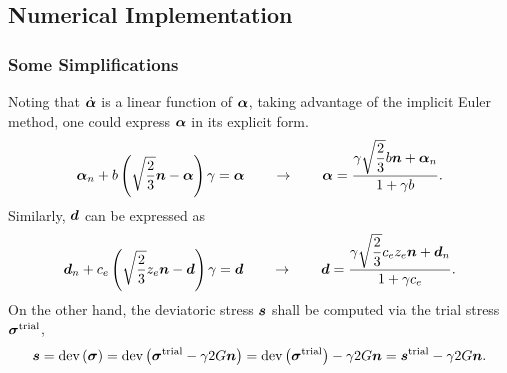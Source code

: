 \subsection{Numerical Implementation}
\subsubsection{Some Simplifications}
Noting that $\dot{\bm{\alpha}}$ is a linear function of $\bm{\alpha}$, taking advantage of the implicit Euler method, one could express $\bm{\alpha}$ in its explicit form.
\begin{gather}\label{eq:explicit_alpha}
    \bm{\alpha}_n+b\left(\sqrt{\dfrac{2}{3}}\bm{n}-\bm{\alpha}\right)\gamma=\bm{\alpha}\qquad\rightarrow\qquad
    \bm{\alpha}=\dfrac{\gamma\sqrt{\dfrac{2}{3}}b\bm{n}+\bm{\alpha}_n}{1+\gamma{}b}.
    \end{gather}
    Similarly, $\bm{d}$ can be expressed as
    \begin{gather}\label{eq:explicit_d}
        \bm{d}_n+c_e\left(\sqrt{\dfrac{2}{3}}z_e\bm{n}-\bm{d}\right)\gamma=\bm{d}\qquad\rightarrow\qquad\bm{d}=\dfrac{\gamma{}\sqrt{\dfrac{2}{3}}c_ez_e\bm{n}+\bm{d}_n}{1+\gamma{}c_e}.
    \end{gather}
    On the other hand, the deviatoric stress $\bm{s}$ shall be computed via the trial stress $\bm{\sigma}^\text{trial}$,
    \begin{gather}
    \bm{s}=\text{dev}\left(\bm{\sigma}\right)=\text{dev}\left(\bm{\sigma}^\text{trial}-\gamma2G\bm{n}\right)=\text{dev}\left(\bm{\sigma}^\text{trial}\right)-\gamma2G\bm{n}=\bm{s}^\text{trial}-\gamma2G\bm{n}.
\end{gather}


